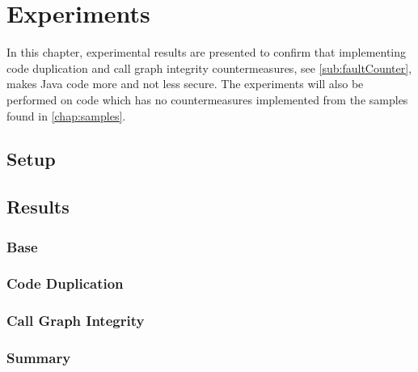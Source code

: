\chapter{Experiments}
In this chapter, experimental results are presented to confirm that implementing code duplication and call graph integrity countermeasures, see \cref{sub:faultCounter}, makes Java code more and not less secure. The experiments will also be performed on code which has no countermeasures implemented from the \jc samples found in \cref{chap:samples}.
%
\section{Setup}

\section{Results}

\subsection{Base}

\subsection{Code Duplication}

\subsection{Call Graph Integrity}

\subsection{Summary}

